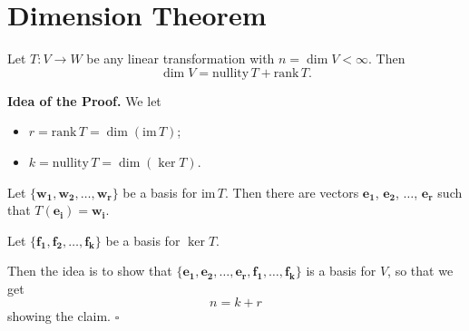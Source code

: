 \documentclass[20pt,a4paper]{extarticle}
\newcommand{\ra}{\rightarrow}
\newcounter{theorem}
\begin{document}
\newpage 

\phantom{2}

\newpage 

\section{Dimension Theorem}

\begin{theorem}
Let $T : V \ra W$ be any linear transformation with $n = \dim V < \infty$. Then
	\[
		\dim V = \mathrm{nullity}\, T + \mathrm{rank} \, T .
	\]
\end{theorem}

\textbf{Idea of the Proof.} We let
	\begin{itemize}
		\item $r = \mathrm{rank} \, T = \dim (\mathrm{im} \, T)$;
		\item $k = \mathrm{nullity} \, T = \dim (\ker T)$.
	\end{itemize} 

Let $\{ \mathbf{w_1} , \mathbf{w_2} , \ldots , \mathbf{w_r} \}$ be a basis for $\mathrm{im} \, T$. Then there are vectors $\mathbf{e_1}$, $\mathbf{e_2}$, $\ldots$, $\mathbf{e_r}$ such that $T (\mathbf{e_i}) = \mathbf{w_i}$. 

Let $\{ \mathbf{f_1} , \mathbf{f_2} , \ldots , \mathbf{f_k} \}$ be a basis for $\ker T$. 

Then the idea is to show that $\{ \mathbf{e_1} , \mathbf{e_2} , \ldots , \mathbf{e_r} , \mathbf{f_1} , \ldots , \mathbf{f_k} \}$ is a basis for $V$, so that we get
	\[
		n = k + r
	\]
showing the claim. \hfill $\square$
\end{document}
